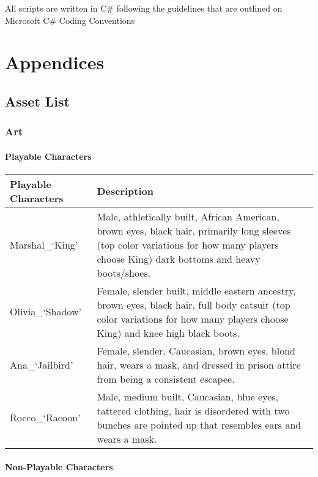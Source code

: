 \documentclass[11pt]{report}
\begin{document}
All scripts are written in C\# following the guidelines that are outlined on Microsoft C\# Coding Conventions


\chapter{Appendices}

\section{Asset List}

\subsection{Art}

\subsubsection{Playable Characters}

\begin{center}
    \begin{tabular}{| p{.45\linewidth} | p{.45\linewidth}|} 
        \hline
        Playable Characters & Description \\ \hline
        Marshal\_`King'  &   Male, athletically built, African American, brown eyes, black hair, primarily long sleeves (top color variations for how many players choose King) dark bottoms and heavy boots/shoes.  \\ \hline
        Olivia\_`Shadow' &   Female, slender built, middle eastern ancestry, brown eyes, black hair, full body catsuit (top color variations for how many players choose King) and knee high black boots.  \\ \hline
        Ana\_`Jailbird'  &   Female, slender, Caucasian, brown eyes, blond hair, wears a mask, and dressed in prison attire from being a consistent escapee.  \\ \hline
        Rocco\_`Racoon'  &   Male, medium built, Caucasian, blue eyes, tattered clothing, hair is disordered with two bunches are pointed up that resembles ears and wears a mask.  \\
        \hline
    \end{tabular}
\end{center}
    
\subsubsection{Non-Playable Characters}
\end{document}
